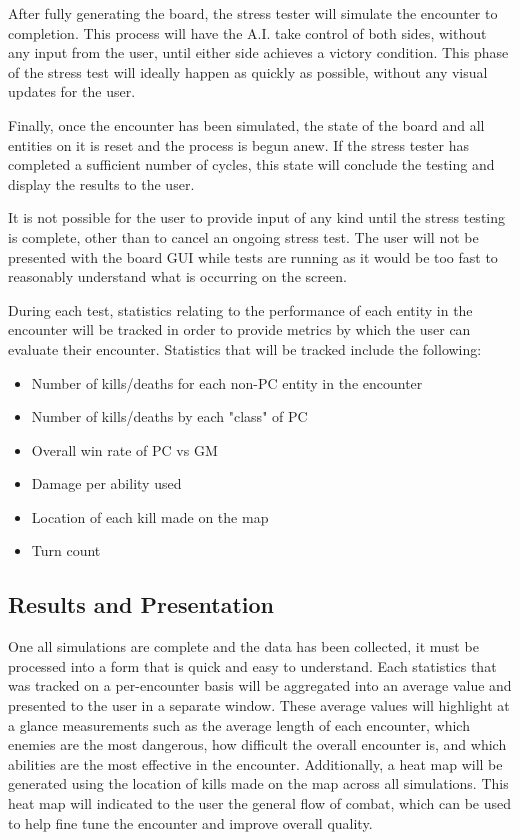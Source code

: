 \documentclass[12pt,a4paper]{report}
\begin{document}
		After fully generating the board, the stress tester will simulate the encounter to completion. This process will have the A.I. take control of both sides, without any input from the user, until either side achieves a victory condition. This phase of the stress test will ideally happen as quickly as possible, without any visual updates for the user. 
		
		Finally, once the encounter has been simulated, the state of the board and all entities on it is reset and the process is begun anew. If the stress tester has completed a sufficient number of cycles, this state will conclude the testing and display the results to the user. 
		
		It is not possible for the user to provide input of any kind until the stress testing is complete, other than to cancel an ongoing stress test. The user will not be presented with the board GUI while tests are running as it would be too fast to reasonably understand what is occurring on the screen. 
		
		During each test, statistics relating to the performance of each entity in the encounter will be tracked in order to provide metrics by which the user can evaluate their encounter. Statistics that will be tracked include the following:
		 
		\begin{itemize}
			\item Number of kills/deaths for each non-PC entity in the encounter
			\item Number of kills/deaths by each "class" of PC
			\item Overall win rate of PC vs GM
			\item Damage per ability used
			\item Location of each kill made on the map
			\item Turn count
		\end{itemize}
	
		\subsection{Results and Presentation}
		One all simulations are complete and the data has been collected, it must be processed into a form that is quick and easy to understand. Each statistics that was tracked on a per-encounter basis will be aggregated into an average value and presented to the user in a separate window. These average values will highlight at a glance measurements such as the average length of each encounter, which enemies are the most dangerous, how difficult the overall encounter is, and which abilities are the most effective in the encounter. Additionally, a heat map will be generated using the location of kills made on the map across all simulations. This heat map will indicated to the user the general flow of combat, which can be used to help fine tune the encounter and improve overall quality. 
	
\end{document}
